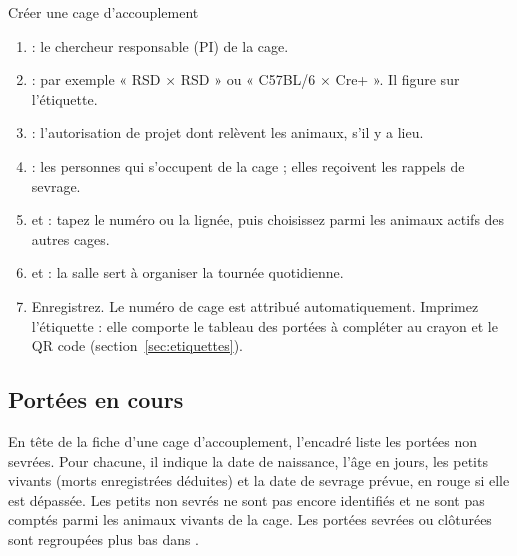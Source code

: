 \documentclass[11pt,a4paper]{article}
\begin{document}
\begin{procedure}{Créer une cage d'accouplement}
\begin{enumerate}
  \item {} : le chercheur responsable (PI) de la cage.
  \item {} : par exemple « RSD × RSD » ou
    « C57BL/6 × Cre+ ». Il figure sur l'étiquette.
  \item {} : l'autorisation de projet dont relèvent les
    animaux, s'il y a lieu.
  \item {} : les personnes qui s'occupent de la cage ; elles
    reçoivent les rappels de sevrage.
  \item {} et  : tapez le numéro ou la lignée, puis choisissez parmi les
    animaux actifs des autres cages.
  \item {} et  : la salle sert à organiser la tournée
    quotidienne.
  \item Enregistrez. Le numéro de cage est attribué automatiquement.
    Imprimez l'étiquette : elle comporte le tableau des portées à compléter
    au crayon et le QR code (section~\ref{sec:etiquettes}).
\end{enumerate}
\end{procedure}

\subsection{Portées en cours}
En tête de la fiche d'une cage d'accouplement, l'encadré  liste les portées non sevrées. Pour chacune, il indique la date de
naissance, l'âge en jours, les petits vivants (morts enregistrées déduites) et
la date de sevrage prévue, en rouge si elle est dépassée. Les petits non
sevrés ne sont pas encore identifiés et ne sont pas comptés parmi les animaux
vivants de la cage. Les portées sevrées ou clôturées sont regroupées plus bas
dans .

\end{document}
